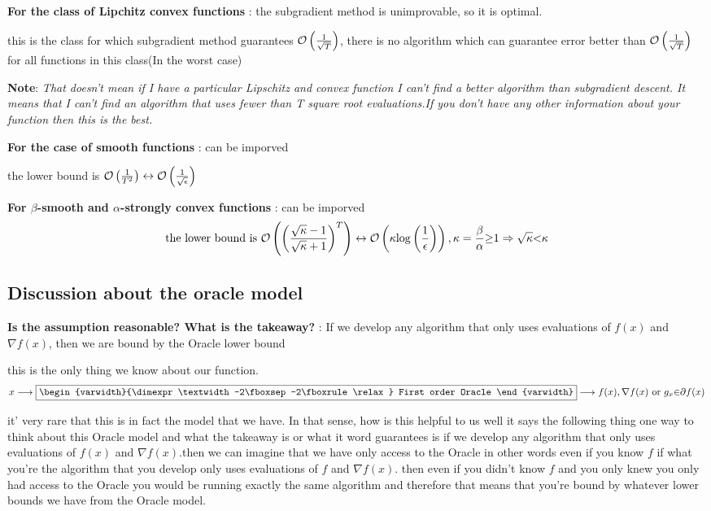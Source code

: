 \documentclass[twoside]{article}
\begin{document}
\textbf{For the class of Lipchitz convex functions} : the subgradient method is unimprovable, so it is optimal.

this is the class for which subgradient method guarantees $\mathcal{O}\left({1 \over {\sqrt{T}}}\right)$, there is no algorithm which can guarantee error better than $\mathcal{O}\left({1 \over {\sqrt{T}}}\right)$ for all functions in this class(In the worst case)

{\bf Note}: {\it That doesn't mean if I have a particular Lipschitz and convex function I can't find a better algorithm than subgradient descent. It means that I can't find an algorithm that uses fewer than T square root evaluations.If you don't have any other information about your function then this is the best.}

\textbf{For the case of smooth functions} : can be imporved
\begin{center}
the lower bound is $\mathcal{O}\left({1 \over T^2}\right) \leftrightarrow \mathcal{O}\left({1 \over \sqrt{\epsilon}}\right)$
\end{center}

\textbf{For $\beta$-smooth and $\alpha$-strongly convex functions} : can be imporved
$$ \text{the lower bound is  } \mathcal{O}\left(\left({\sqrt{\kappa}-1 \over \sqrt{\kappa}+1}\right)^T\right)  \leftrightarrow \mathcal{O}\left(\kappa{\log\left({1 \over \epsilon}\right)}\right) , \kappa = {\beta \over \alpha}{\geq}{ 1 }\Rightarrow{\sqrt{\kappa}}{<}{\kappa}  $$

\subsection{Discussion about the oracle model}

\textbf{Is the assumption reasonable? What is the takeaway?} : If we develop any algorithm that only uses evaluations of $f(x)$ and $\nabla{f(x)}$, then we are bound by the Oracle lower bound

this is the only thing we know about our function. 
$$x\longrightarrow
\fbox{\begin{varwidth}{\dimexpr\textwidth-2\fboxsep-2\fboxrule\relax}
First order Oracle

\end{varwidth}}
\longrightarrow f(x),{\nabla}f(x) {\text{ or }} g_x {\in} {\partial}f(x)$$

it' very rare that this is in fact the model that we have. In that sense, how is this helpful to us well it says the following thing one way to think about this Oracle model and what the takeaway is or what it word guarantees is if we develop any algorithm that only uses evaluations of $f(x)$ and $\nabla{f(x)}$.then we can imagine that we have only access to the Oracle in other words even if you know $f$ if what you're the algorithm that you develop only uses evaluations of $f$ and $\nabla{f(x)}$. then even if you didn't know $f$ and you only knew you only had access to the Oracle you would be running exactly the same algorithm and therefore that means that you're bound by whatever lower bounds we have from the Oracle model. 
\end{document}
